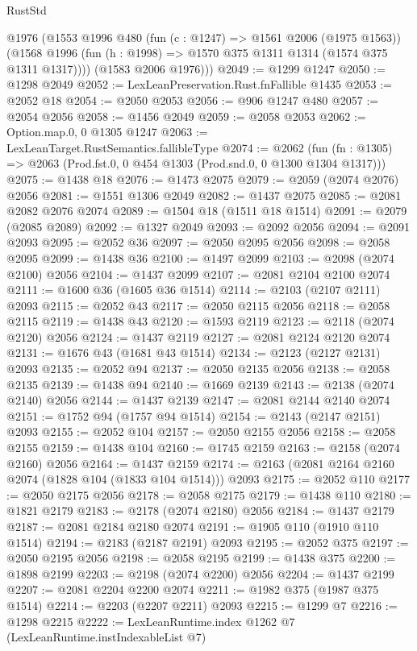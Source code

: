 \begin{lexlean}{RustStd}
\begin{coremodule}
        @1976
        (@1553
          @1996
          @480
          (fun (c : @1247) => @1561 @2006 (@1975 @1563))
          (@1568 @1996 (fun (h : @1998) => @1570 @375 @1311 @1314 (@1574 @375 @1311 @1317))))
        (@1583 @2006 @1976)))
@2049 := @1299 @1247
@2050 := @1298 @2049
@2052 := LexLeanPreservation.Rust.fnFallible @1435
@2053 := @2052 @18
@2054 := @2050 @2053
@2056 := @906 @1247 @480
@2057 := @2054 @2056
@2058 := @1456 @2049
@2059 := @2058 @2053
@2062 := Option.map.{0, 0} @1305 @1247
@2063 := LexLeanTarget.RustSemantics.fallibleType
@2074 := @2062
    (fun (fn : @1305) => @2063 (Prod.fst.{0, 0} @454 @1303 (Prod.snd.{0, 0} @1300 @1304 @1317)))
@2075 := @1438 @18
@2076 := @1473 @2075
@2079 := @2059 (@2074 @2076) @2056
@2081 := @1551 @1306 @2049
@2082 := @1437 @2075
@2085 := @2081 @2082 @2076 @2074
@2089 := @1504 @18 (@1511 @18 @1514)
@2091 := @2079 (@2085 @2089)
@2092 := @1327 @2049
@2093 := @2092 @2056
@2094 := @2091 @2093
@2095 := @2052 @36
@2097 := @2050 @2095 @2056
@2098 := @2058 @2095
@2099 := @1438 @36
@2100 := @1497 @2099
@2103 := @2098 (@2074 @2100) @2056
@2104 := @1437 @2099
@2107 := @2081 @2104 @2100 @2074
@2111 := @1600 @36 (@1605 @36 @1514)
@2114 := @2103 (@2107 @2111) @2093
@2115 := @2052 @43
@2117 := @2050 @2115 @2056
@2118 := @2058 @2115
@2119 := @1438 @43
@2120 := @1593 @2119
@2123 := @2118 (@2074 @2120) @2056
@2124 := @1437 @2119
@2127 := @2081 @2124 @2120 @2074
@2131 := @1676 @43 (@1681 @43 @1514)
@2134 := @2123 (@2127 @2131) @2093
@2135 := @2052 @94
@2137 := @2050 @2135 @2056
@2138 := @2058 @2135
@2139 := @1438 @94
@2140 := @1669 @2139
@2143 := @2138 (@2074 @2140) @2056
@2144 := @1437 @2139
@2147 := @2081 @2144 @2140 @2074
@2151 := @1752 @94 (@1757 @94 @1514)
@2154 := @2143 (@2147 @2151) @2093
@2155 := @2052 @104
@2157 := @2050 @2155 @2056
@2158 := @2058 @2155
@2159 := @1438 @104
@2160 := @1745 @2159
@2163 := @2158 (@2074 @2160) @2056
@2164 := @1437 @2159
@2174 := @2163 (@2081 @2164 @2160 @2074 (@1828 @104 (@1833 @104 @1514))) @2093
@2175 := @2052 @110
@2177 := @2050 @2175 @2056
@2178 := @2058 @2175
@2179 := @1438 @110
@2180 := @1821 @2179
@2183 := @2178 (@2074 @2180) @2056
@2184 := @1437 @2179
@2187 := @2081 @2184 @2180 @2074
@2191 := @1905 @110 (@1910 @110 @1514)
@2194 := @2183 (@2187 @2191) @2093
@2195 := @2052 @375
@2197 := @2050 @2195 @2056
@2198 := @2058 @2195
@2199 := @1438 @375
@2200 := @1898 @2199
@2203 := @2198 (@2074 @2200) @2056
@2204 := @1437 @2199
@2207 := @2081 @2204 @2200 @2074
@2211 := @1982 @375 (@1987 @375 @1514)
@2214 := @2203 (@2207 @2211) @2093
@2215 := @1299 @7
@2216 := @1298 @2215
@2222 := LexLeanRuntime.index @1262 @7 (LexLeanRuntime.instIndexableList @7)

\end{coremodule}
\end{lexlean}
